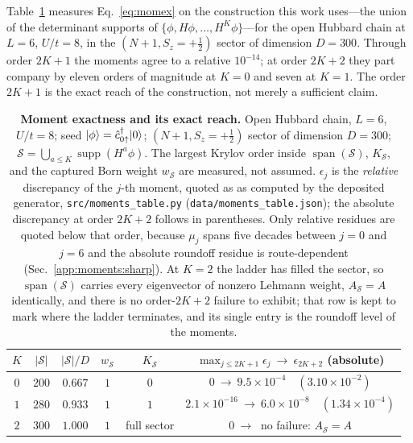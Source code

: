 Table~\ref{tab:moments} measures Eq.~\eqref{eq:momex} on the construction this work uses---the union of
the determinant supports of $\{\phi,H\phi,\dots,H^{K}\phi\}$---for the open Hubbard chain at $L=6$,
$U/t=8$, in the $(N{+}1,S_z{=}{+}\tfrac12)$ sector of dimension $D=300$. Through order $2K+1$ the moments
agree to a relative $10^{-14}$; at order $2K{+}2$ they part company by eleven orders of magnitude at
$K=0$ and seven at $K=1$. The order $2K+1$ is the exact reach of the construction, not merely a
sufficient claim.

\begin{table}[tp]\centering\small
\caption{\textbf{Moment exactness and its exact reach.} Open Hubbard chain, $L=6$, $U/t=8$; seed
$\lvert \phi \rangle=\hat c^{\dagger}_{0\uparrow}\lvert 0 \rangle$; $(N{+}1,S_z{=}{+}\tfrac12)$ sector of dimension $D=300$;
$\mathcal S=\bigcup_{a\le K}\operatorname{supp}(H^{a}\phi)$. The largest Krylov order inside
$\operatorname{span}(\mathcal S)$, $K_{\mathcal S}$, and the captured Born weight $w_{\mathcal S}$ are
measured, not assumed. $\epsilon_j$ is the \emph{relative} discrepancy of the $j$-th moment, quoted as
as computed by the deposited generator, \texttt{src/moments\_table.py}
(\texttt{data/moments\_table.json}); the absolute discrepancy at order $2K{+}2$ follows in parentheses. Only relative residues are quoted below that order, because
$\mu_j$ spans five decades between $j=0$ and $j=6$ and the absolute roundoff residue is
route-dependent (Sec.~\ref{app:moments:sharp}). At $K=2$ the ladder has filled the sector, so
$\operatorname{span}(\mathcal S)$ carries every eigenvector of nonzero Lehmann weight,
$A_{\mathcal S}=A$ identically, and there is no order-$2K{+}2$ failure to exhibit; that row is kept to
mark where the ladder terminates, and its single entry is the roundoff level of the moments.}
\label{tab:moments}
\begin{tabular}{cccccc}\toprule
$K$ & $|\mathcal S|$ & $|\mathcal S|/D$ & $w_{\mathcal S}$ & $K_{\mathcal S}$ &
$\max_{j\le 2K+1}\epsilon_j\ \longrightarrow\ \epsilon_{2K+2}$ (absolute) \\ \midrule
$0$ & $200$ & $0.667$ & $1$ & $0$ &
$0\ \longrightarrow\ 9.5\times10^{-4}$\ \ $(3.10\times10^{-2})$ \\
$1$ & $280$ & $0.933$ & $1$ & $1$ &
$2.1\times10^{-16}\ \longrightarrow\ 6.0\times10^{-8}$\ \ $(1.34\times10^{-4})$ \\
$2$ & $300$ & $1.000$ & $1$ & full sector &
$0\ \longrightarrow\ $ no failure: $A_{\mathcal S}=A$ \\
\bottomrule\end{tabular}
\end{table}

